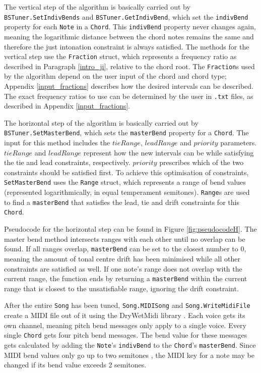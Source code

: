 \documentclass[a4paper]{article}
\begin{document}
\begin{sloppypar}
The vertical step of the algorithm is basically carried out by \texttt{BSTuner.SetIndivBends} and \texttt{BSTuner.GetIndivBend}, which set the \texttt{indivBend} property for each \texttt{Note} in a \texttt{Chord}. This \texttt{indivBend} property never changes again, meaning the logarithmic distance between the chord notes remains the same and therefore the just intonation constraint is always satisfied. The methods for the vertical step use the \texttt{Fraction} struct, which represents a frequency ratio as described in Paragraph \ref{intro_ji}, relative to the chord root. The \texttt{Fraction}s used by the algorithm depend on the user input of the chord and chord type; Appendix \ref{input_fractions} describes how the desired intervals can be described. The exact frequency ratios to use can be determined by the user in \texttt{.txt} files, as described in Appendix \ref{input_fractions}.

The horizontal step of the algorithm is basically carried out by \texttt{BSTuner.SetMasterBend}, which sets the \texttt{masterBend} property for a \texttt{Chord}. The input for this method includes the $\mathit{tieRange}$, $\mathit{leadRange}$ and $\mathit{priority}$ parameters. $\mathit{tieRange}$ and $\mathit{leadRange}$ represent how  the new intervals can be while satisfying the tie and lead constraints, respectively. $\mathit{priority}$ prescribes which of the two constraints should be satisfied first. To achieve this optimisation of constraints, \texttt{SetMasterBend} uses the \texttt{Range} struct, which represents a range of bend values (represented logarithmically, in equal temperament semitones). \texttt{Range}s are used to find a \texttt{masterBend} that satisfies the lead, tie and drift constraints for this \texttt{Chord}.
\end{sloppypar}

Pseudocode for the horizontal step can be found in Figure \ref{fig:pseudocodeH}. The master bend method intersects ranges with each other until no overlap can be found. If all ranges overlap, \texttt{masterBend} can be set to the closest number to 0, meaning the amount of tonal centre drift has been minimised while all other constraints are satisfied as well. If one note's range does not overlap with the current range, the function ends by returning a \texttt{masterBend} within the current range that is closest to the unsatisfiable range, ignoring the drift constraint.

After the entire \texttt{Song} has been tuned, \texttt{Song.MIDISong} and \texttt{Song.WriteMidiFile} create a MIDI file out of it using the DryWetMidi library \cite{dobroselsky_melanchalldrywetmidi_2023}. Each voice gets its own channel, meaning pitch bend messages only apply to a single voice. Every single \texttt{Chord} gets four pitch bend messages. The bend value for these messages gets calculated by adding the \texttt{Note}'s \texttt{indivBend} to the \texttt{Chord}'s \texttt{masterBend}. Since MIDI bend values only go up to two semitones \cite{midi_manufacturers_association_complete_2014}, the MIDI key for a note may be changed if its bend value exceeds 2 semitones.
\end{document}
